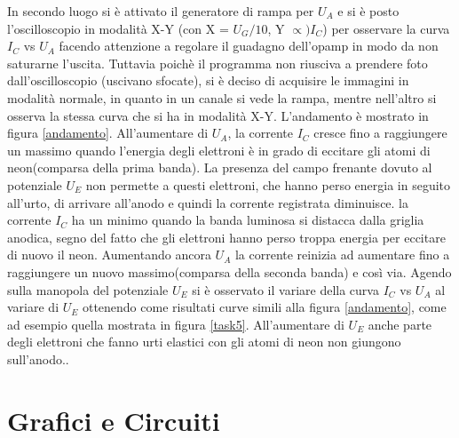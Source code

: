 \documentclass[a4paper,10pt]{article}
\begin{document}

In secondo luogo si è attivato il generatore di rampa per $U_{A}$ e si è posto l'oscilloscopio in modalità X-Y (con X = $U_{G}/10$, Y $\propto) I_{C}$) per osservare la curva $I_{C}$ vs $U_{A}$ facendo attenzione a regolare il guadagno dell'opamp in modo da non saturarne l'uscita. Tuttavia poichè il programma non riusciva a prendere foto dall'oscilloscopio (uscivano sfocate), si è deciso di acquisire le immagini in modalità normale, in quanto in un canale si vede la rampa, mentre nell'altro si osserva la stessa curva che si ha in modalità X-Y.
L'andamento è mostrato in figura \ref{andamento}.
All'aumentare di $U_{A}$, la corrente $I_{C}$ cresce fino a raggiungere un massimo quando l'energia degli elettroni è in grado di eccitare gli atomi di neon(comparsa della prima banda). La presenza del campo frenante dovuto al potenziale $U_{E}$ non permette a questi elettroni, che hanno perso energia in seguito all'urto, di arrivare all'anodo e quindi la corrente registrata diminuisce. la corrente $I_{C}$ ha un minimo quando la banda luminosa si distacca dalla griglia anodica, segno del fatto che gli elettroni hanno perso troppa energia per eccitare di nuovo il neon.
Aumentando ancora $U_{A}$ la corrente reinizia ad aumentare fino a raggiungere un nuovo massimo(comparsa della seconda banda) e così via.
Agendo sulla manopola del potenziale $U_{E}$ si è osservato il variare della curva $I_{C}$ vs $U_{A}$ al variare di $U_{E}$ ottenendo come risultati curve simili alla figura \ref{andamento}, come ad esempio quella mostrata in figura \ref{task5}. All'aumentare di $U_{E}$ anche parte degli elettroni che fanno urti elastici con gli atomi di neon non giungono sull'anodo..%
  

 \subsection{}

\section{Grafici e Circuiti}
\end{document}
